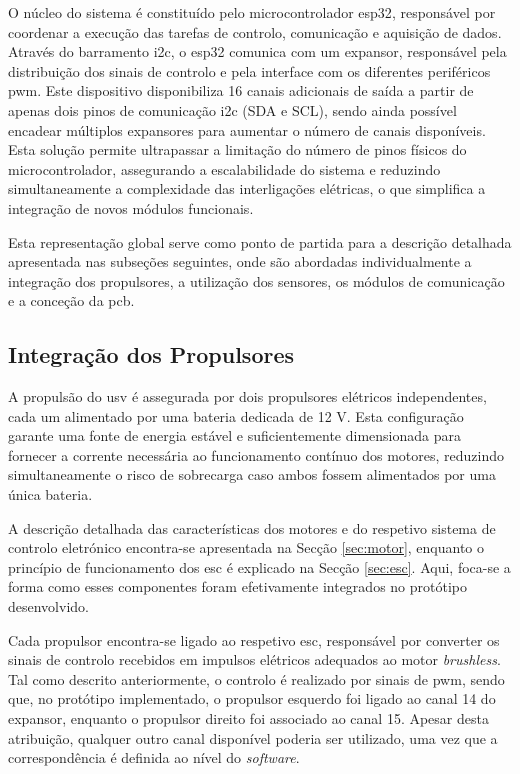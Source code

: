 O núcleo do sistema é constituído pelo microcontrolador \gls{esp32}, responsável por coordenar a execução das tarefas de controlo, comunicação e aquisição de dados. Através do barramento \gls{i2c}, o \gls{esp32} comunica com um expansor, responsável pela distribuição dos sinais de controlo e pela interface com os diferentes periféricos \gls{pwm}. Este dispositivo disponibiliza 16 canais adicionais de saída a partir de apenas dois pinos de comunicação \gls{i2c} (SDA e SCL), sendo ainda possível encadear múltiplos expansores para aumentar o número de canais disponíveis. Esta solução permite ultrapassar a limitação do número de pinos físicos do microcontrolador, assegurando a escalabilidade do sistema e reduzindo simultaneamente a complexidade das interligações elétricas, o que simplifica a integração de novos módulos funcionais.

Esta representação global serve como ponto de partida para a descrição detalhada apresentada nas subseções seguintes, onde são abordadas individualmente a integração dos propulsores, a utilização dos sensores, os módulos de comunicação e a conceção da \gls{pcb}.

\subsection{Integração dos Propulsores}
\label{subsec:integracao-propulsores}

A propulsão do \gls{usv} é assegurada por dois propulsores elétricos independentes, cada um alimentado por uma bateria dedicada de 12 V. Esta configuração garante uma fonte de energia estável e suficientemente dimensionada para fornecer a corrente necessária ao funcionamento contínuo dos motores, reduzindo simultaneamente o risco de sobrecarga caso ambos fossem alimentados por uma única bateria.  

A descrição detalhada das características dos motores e do respetivo sistema de controlo eletrónico encontra-se apresentada na Secção \ref{sec:motor}, enquanto o princípio de funcionamento dos \gls{esc} é explicado na Secção \ref{sec:esc}. Aqui, foca-se a forma como esses componentes foram efetivamente integrados no protótipo desenvolvido.  

Cada propulsor encontra-se ligado ao respetivo \gls{esc}, responsável por converter os sinais de controlo recebidos em impulsos elétricos adequados ao motor \emph{brushless}. Tal como descrito anteriormente, o controlo é realizado por sinais de \gls{pwm}, sendo que, no protótipo implementado, o propulsor esquerdo foi ligado ao canal 14 do expansor, enquanto o propulsor direito foi associado ao canal 15. Apesar desta atribuição, qualquer outro canal disponível poderia ser utilizado, uma vez que a correspondência é definida ao nível do \emph{software}.  

